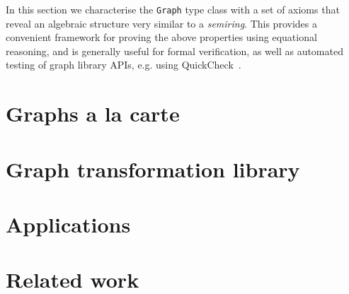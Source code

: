 \documentclass[acmlarge,anonymous]{acmart}\settopmatter{printfolios=true}
\newcommand{\hs}{\texttt}
\begin{document}
In this section we characterise the \hs{Graph} type class with a set of
axioms that reveal an algebraic structure very similar to a \emph{semiring}.
This provides a convenient framework for proving the above properties using equational
reasoning, and is generally useful for formal verification, as well as automated testing
of graph library APIs, e.g. using QuickCheck~\cite{2011_quickcheck_claessen}.

\section{Graphs a la carte}\label{sec-a-la-carte}

\section{Graph transformation library}\label{sec-transformations}

\section{Applications}\label{sec-applications}

\section{Related work}\label{sec-related}



\end{document}
